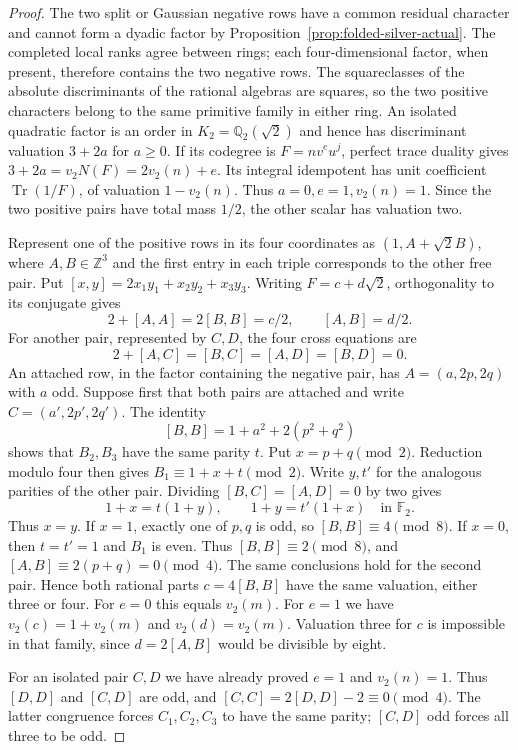 \documentclass[11pt,reqno]{amsart}
\theoremstyle{remark}\newtheorem{remark}[theorem]{Remark}
\numberwithin{equation}{section}
\begin{document}
\begin{proof}
The two split or Gaussian negative rows have a common residual character and cannot form a dyadic factor by Proposition~\ref{prop:folded-silver-actual}. The completed local ranks agree between rings; each four-dimensional factor, when present, therefore contains the two negative rows. The squareclasses of the absolute discriminants of the rational algebras are squares, so the two positive characters belong to the same primitive family in either ring. An isolated quadratic factor is an order in $K_2=\mathbb Q_2(\sqrt2)$ and hence has discriminant valuation $3+2a$ for $a\ge0$. If its codegree is $F=n v^e u^j$, perfect trace duality gives $3+2a=v_2 N(F)=2v_2(n)+e$. Its integral idempotent has unit coefficient $\operatorname{Tr}(1/F)$, of valuation $1-v_2(n)$. Thus $a=0,e=1,v_2(n)=1$. Since the two positive pairs have total mass $1/2$, the other scalar has valuation two.

Represent one of the positive rows in its four coordinates as $(1,A+\sqrt2 B)$, where $A,B\in\mathbb Z^3$ and the first entry in each triple corresponds to the other free pair. Put $[x,y]=2x_1y_1+x_2y_2+x_3y_3$. Writing $F=c+d\sqrt2$, orthogonality to its conjugate gives
\[
 2+[A,A]=2[B,B]=c/2,\qquad [A,B]=d/2.
\]
For another pair, represented by $C,D$, the four cross equations are
\[
 2+[A,C]=[B,C]=[A,D]=[B,D]=0.
\]
An attached row, in the factor containing the negative pair, has
$A=(a,2p,2q)$ with $a$ odd. Suppose first that both pairs are
attached and write $C=(a',2p',2q')$. The identity
\[
   [B,B]=1+a^2+2(p^2+q^2)
\]
shows that $B_2,B_3$ have the same parity $t$. Put $x=p+q\pmod2$.
Reduction modulo four then gives $B_1\equiv1+x+t\pmod2$.
Write $y,t'$ for the analogous parities of the other pair.
Dividing $[B,C]=[A,D]=0$ by two gives
\[
       1+x=t(1+y),\qquad 1+y=t'(1+x)\quad\text{in }\mathbb F_2 .
\]
Thus $x=y$. If $x=1$, exactly one of $p,q$ is odd, so
$[B,B]\equiv4\pmod8$. If $x=0$, then $t=t'=1$ and $B_1$ is
even. Thus $[B,B]\equiv2\pmod8$, and $[A,B]\equiv2(p+q)=0\pmod4$.
The same conclusions hold for the second pair. Hence both rational
parts $c=4[B,B]$ have the same valuation, either three or four.
For $e=0$ this equals $v_2(m)$. For $e=1$ we have
$v_2(c)=1+v_2(m)$ and $v_2(d)=v_2(m)$. Valuation three for $c$
is impossible in that family, since $d=2[A,B]$ would be divisible
by eight.

For an isolated pair $C,D$ we have already proved $e=1$ and
$v_2(n)=1$. Thus $[D,D]$ and $[C,D]$ are odd, and
$[C,C]=2[D,D]-2\equiv0\pmod4$. The latter congruence forces
$C_1,C_2,C_3$ to have the same parity; $[C,D]$ odd forces all three
to be odd.


\end{proof}
\end{document}
